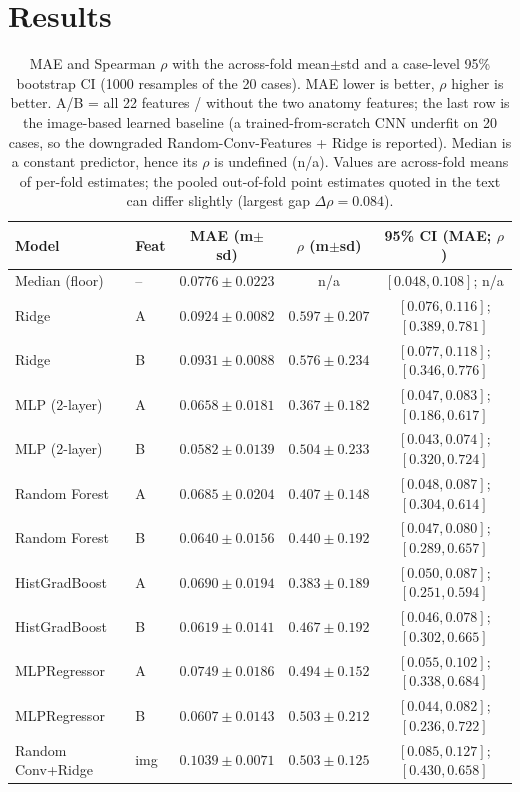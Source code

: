\documentclass[conference]{IEEEtran}
\begin{document}
\section{Results}
\begin{table}[!t]
\centering
\caption{MAE and Spearman $\rho$ with the across-fold mean$\pm$std and a
case-level 95\% bootstrap CI (1000 resamples of the 20 cases). MAE lower is
better, $\rho$ higher is better. A/B = all 22 features / without the two anatomy
features; the last row is the image-based learned baseline (a trained-from-scratch
CNN underfit on 20 cases, so the downgraded Random-Conv-Features + Ridge is
reported). Median is a constant predictor, hence its $\rho$ is undefined (n/a). Values are across-fold means of per-fold estimates; the pooled out-of-fold point estimates quoted in the text can differ slightly (largest gap $\Delta\rho=0.084$).}
\label{tab:main}
\small
\begin{tabular}{llccc}
\toprule
Model & Feat & MAE (m$\pm$sd) & $\rho$ (m$\pm$sd) & 95\% CI (MAE; $\rho$) \\
\midrule
Median (floor) & --  & $0.0776\pm0.0223$ & n/a & $[0.048,0.108]$; n/a \\
Ridge & A & $0.0924\pm0.0082$ & $0.597\pm0.207$ & $[0.076,0.116]$; $[0.389,0.781]$ \\
Ridge & B & $0.0931\pm0.0088$ & $0.576\pm0.234$ & $[0.077,0.118]$; $[0.346,0.776]$ \\
MLP (2-layer) & A & $0.0658\pm0.0181$ & $0.367\pm0.182$ & $[0.047,0.083]$; $[0.186,0.617]$ \\
MLP (2-layer) & B & $0.0582\pm0.0139$ & $0.504\pm0.233$ & $[0.043,0.074]$; $[0.320,0.724]$ \\
Random Forest & A & $0.0685\pm0.0204$ & $0.407\pm0.148$ & $[0.048,0.087]$; $[0.304,0.614]$ \\
Random Forest & B & $0.0640\pm0.0156$ & $0.440\pm0.192$ & $[0.047,0.080]$; $[0.289,0.657]$ \\
HistGradBoost & A & $0.0690\pm0.0194$ & $0.383\pm0.189$ & $[0.050,0.087]$; $[0.251,0.594]$ \\
HistGradBoost & B & $0.0619\pm0.0141$ & $0.467\pm0.192$ & $[0.046,0.078]$; $[0.302,0.665]$ \\
MLPRegressor & A & $0.0749\pm0.0186$ & $0.494\pm0.152$ & $[0.055,0.102]$; $[0.338,0.684]$ \\
MLPRegressor & B & $0.0607\pm0.0143$ & $0.503\pm0.212$ & $[0.044,0.082]$; $[0.236,0.722]$ \\
Random Conv+Ridge & img & $0.1039\pm0.0071$ & $0.503\pm0.125$ & $[0.085,0.127]$; $[0.430,0.658]$ \\
\bottomrule
\end{tabular}
\end{table}
\end{document}
